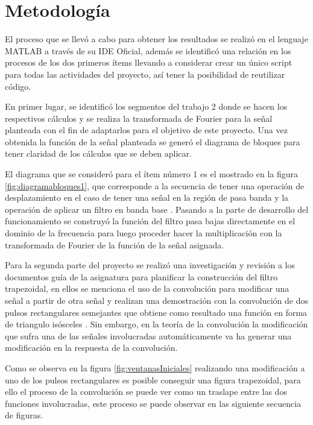 \section{Metodología}\label{metodologia}
El proceso que se llevó a cabo para obtener los resultados se realizó en el lenguaje MATLAB a través de su IDE Oficial, además se identificó una relación en los procesos de los dos primeros ítems llevando a considerar crear un único script para todas las actividades del proyecto, así tener la posibilidad de reutilizar código.

En primer lugar, se identificó los segmentos del trabajo 2 donde se hacen los respectivos cálculos y se realiza la transformada de Fourier para la señal planteada con el fin de adaptarlos para el objetivo de este proyecto. Una vez obtenida la función de la señal planteada se generó el diagrama de bloques para tener claridad de los cálculos que se deben aplicar.


\vspace{-5mm}

El diagrama que se consideró para el ítem número 1 es el mostrado en la figura \ref{fig:diagramabloques1}, que corresponde a la secuencia de tener una operación de desplazamiento en el caso de tener una señal en la región de pasa banda y la operación de aplicar un filtro en banda base \cite{}. Pasando a la parte de desarrollo del funcionamiento se construyó la función del filtro pasa bajas directamente en el dominio de la frecuencia para luego proceder hacer la multiplicación con la transformada de Fourier de la función de la señal asignada.

Para la segunda parte del proyecto se realizó una investigación y revisión a los documentos guía de la asignatura para planificar la construcción del filtro trapezoidal, en ellos se menciona el uso de la convolución para modificar una señal a partir de otra señal y realizan una demostración con la convolución de dos pulsos rectangulares semejantes que obtiene como resultado una función en forma de triangulo isósceles \cite{}. Sin embargo, en la teoría de la convolución la modificación que sufra una de las señales involucradas automáticamente va ha generar una modificación en la respuesta de la convolución.


\vspace{-5mm}

Como se observa en la figura \ref{fig:ventanasIniciales} realizando una modificación a uno de los pulsos rectangulares es posible conseguir una figura trapezoidal, para ello el proceso de la convolución se puede ver como un traslape entre las dos funciones involucradas, este proceso se puede observar en las siguiente secuencia de figuras.

